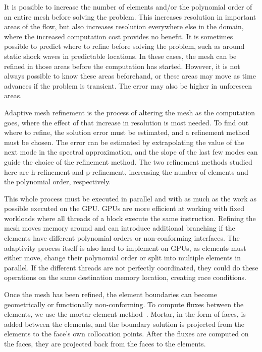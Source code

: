 It is possible to increase the number of elements and/or the polynomial order of an entire mesh
before solving the problem. This increases resolution in important areas of the flow, but also
increases resolution everywhere else in the domain, where the increased computation cost provides no
benefit. It is sometimes possible to predict where to refine before solving the problem, such as
around static shock waves in predictable locations. In these cases, the mesh can be refined in those
areas before the computation has started. However, it is not always possible to know these areas
beforehand, or these areas may move as time advances if the problem is transient. The error may also
be higher in unforeseen areas.

Adaptive mesh refinement is the process of altering the mesh as the computation goes, where the
effect of that increase in resolution is most needed. To find out where to refine, the solution
error must be estimated, and a refinement method must be chosen. The error can be estimated by
extrapolating the value of the next mode in the spectral approximation, and the slope of the last
few modes can guide the choice of the refinement method. The two refinement methods studied here are
h-refinement and p-refinement, increasing the number of elements and the polynomial order,
respectively.

This whole process must be executed in parallel and with as much as the work as possible executed on
the GPU. GPUs are more efficient at working with fixed workloads where all threads of a block
execute the same instruction. Refining the mesh moves memory around and can introduce additional
branching if the elements have different polynomial orders or non-conforming interfaces. The
adaptivity process itself is also hard to implement on GPUs, as elements must either move, change
their polynomial order or split into multiple elements in parallel. If the different threads are not
perfectly coordinated, they could do these operations on the same destination memory location,
creating race conditions.

Once the mesh has been refined, the element boundaries can become geometrically or functionally
non-conforming. To compute fluxes between the elements, we use the mortar element
method~\cite{Maday1989}. Mortar, in the form of faces, is added between the elements, and the
boundary solution is projected from the elements to the face's own collocation points. After the
fluxes are computed on the faces, they are projected back from the faces to the elements. 

